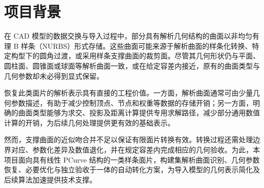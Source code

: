 \section{项目背景}

在 CAD 模型的数据交换与导入过程中，部分具有解析几何结构的曲面以非均匀有理 B 样条（NURBS）形式存储。这些曲面可能来源于解析曲面的样条化转换、特定构型下的圆角过渡，或采用样条支撑曲面的裁剪面。尽管其几何形状仍与平面、圆柱面、圆锥面或球面等解析曲面一致，或在给定容差内接近，原有的曲面类型与几何参数却未必得到显式保留。

恢复此类面片的解析表示具有直接的工程价值。一方面，解析曲面通常可由少量几何参数描述，有助于减少控制顶点、节点和权重等数据的存储开销；另一方面，明确的曲面类型能够为求交、投影及距离计算提供专用求解路径，减少部分通用数值计算的开销，为后续几何处理提供更有效的基础表示。

然而，支撑曲面的近似吻合并不足以保证有限面片转换有效。转换过程还需处理边界对应、参数化差异及数值退化，并在规定容差内完成相应的几何验收。为此，本项目面向具有线性 PCurve 结构的一类样条面片，构建集解析曲面识别、几何参数恢复、必要优化与独立验收于一体的自动转化方案，为导入模型的几何表示简化及后续算法加速提供技术支撑。

